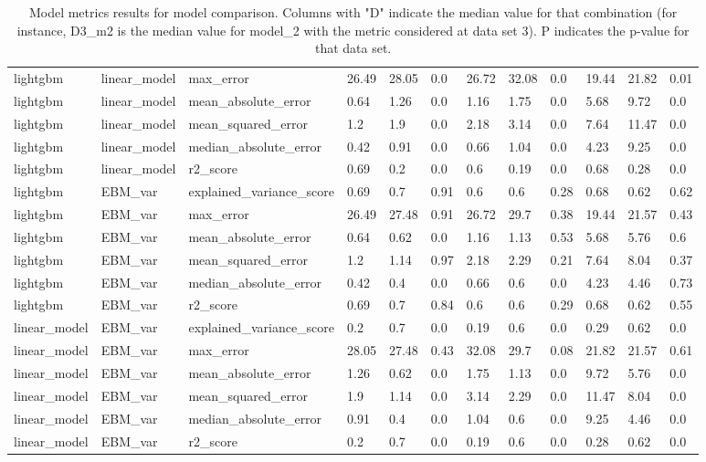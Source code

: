 \begin{table}[h!]
{\begin{tabular}{llllllllllll}
lightgbm      & linear\_model  & max\_error                 & 26.49 & 28.05 & 0.0  & 26.72 & 32.08 & 0.0  & 19.44 & 21.82 & 0.01 \\
lightgbm      & linear\_model  & mean\_absolute\_error      & 0.64  & 1.26  & 0.0  & 1.16  & 1.75  & 0.0  & 5.68  & 9.72  & 0.0  \\
lightgbm      & linear\_model  & mean\_squared\_error       & 1.2   & 1.9   & 0.0  & 2.18  & 3.14  & 0.0  & 7.64  & 11.47 & 0.0  \\
lightgbm      & linear\_model  & median\_absolute\_error    & 0.42  & 0.91  & 0.0  & 0.66  & 1.04  & 0.0  & 4.23  & 9.25  & 0.0  \\
lightgbm      & linear\_model  & r2\_score                  & 0.69  & 0.2   & 0.0  & 0.6   & 0.19  & 0.0  & 0.68  & 0.28  & 0.0  \\
lightgbm      & EBM\_var & explained\_variance\_score & 0.69  & 0.7   & 0.91 & 0.6   & 0.6   & 0.28 & 0.68  & 0.62  & 0.62 \\
lightgbm      & EBM\_var & max\_error                 & 26.49 & 27.48 & 0.91 & 26.72 & 29.7  & 0.38 & 19.44 & 21.57 & 0.43 \\
lightgbm      & EBM\_var & mean\_absolute\_error      & 0.64  & 0.62  & 0.0  & 1.16  & 1.13  & 0.53 & 5.68  & 5.76  & 0.6  \\
lightgbm      & EBM\_var & mean\_squared\_error       & 1.2   & 1.14  & 0.97 & 2.18  & 2.29  & 0.21 & 7.64  & 8.04  & 0.37 \\
lightgbm      & EBM\_var & median\_absolute\_error    & 0.42  & 0.4   & 0.0  & 0.66  & 0.6   & 0.0  & 4.23  & 4.46  & 0.73 \\
lightgbm      & EBM\_var & r2\_score                  & 0.69  & 0.7   & 0.84 & 0.6   & 0.6   & 0.29 & 0.68  & 0.62  & 0.55 \\
linear\_model & EBM\_var & explained\_variance\_score & 0.2   & 0.7   & 0.0  & 0.19  & 0.6   & 0.0  & 0.29  & 0.62  & 0.0  \\
linear\_model & EBM\_var & max\_error                 & 28.05 & 27.48 & 0.43 & 32.08 & 29.7  & 0.08 & 21.82 & 21.57 & 0.61 \\
linear\_model & EBM\_var & mean\_absolute\_error      & 1.26  & 0.62  & 0.0  & 1.75  & 1.13  & 0.0  & 9.72  & 5.76  & 0.0  \\
linear\_model & EBM\_var & mean\_squared\_error       & 1.9   & 1.14  & 0.0  & 3.14  & 2.29  & 0.0  & 11.47 & 8.04  & 0.0  \\
linear\_model & EBM\_var & median\_absolute\_error    & 0.91  & 0.4   & 0.0  & 1.04  & 0.6   & 0.0  & 9.25  & 4.46  & 0.0  \\
linear\_model & EBM\_var & r2\_score                  & 0.2   & 0.7   & 0.0  & 0.19  & 0.6   & 0.0  & 0.28  & 0.62  & 0.0 
\end{tabular}
}
\caption{Model metrics results for model comparison. Columns with "D" indicate the median value for that combination (for instance, D3\_m2 is the median value for model\_2 with the metric considered at data set 3). P indicates the p-value for that data set.}
\label{table:annex-model-metrics-contrast}
\end{table}


